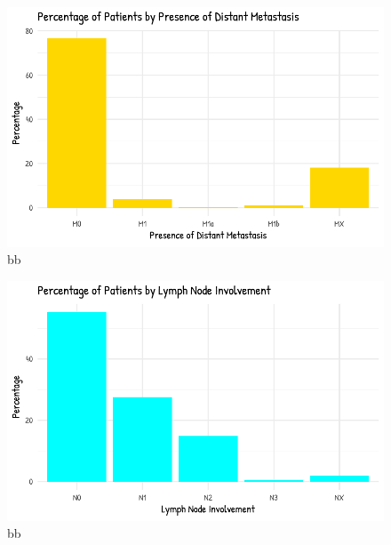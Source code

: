 \documentclass[
  letterpaper,
  DIV=11,
  numbers=noendperiod]{scrartcl}
\begin{document}
\begin{figure}

{\centering \includegraphics{paper_files/figure-pdf/fig-bills-3.pdf}

}

\caption{\label{fig-bills-3}bb}

\end{figure}

\begin{figure}

{\centering \includegraphics{paper_files/figure-pdf/fig-bills-4.pdf}

}

\caption{\label{fig-bills-4}bb}

\end{figure}
\end{document}

